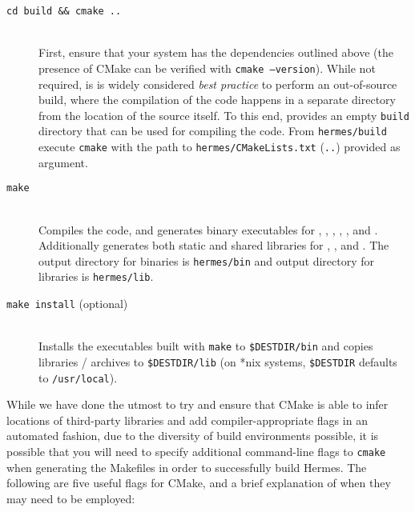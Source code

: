 \documentclass[11pt]{article}
\begin{document}
\begin{description}
  \item[{\tt cd build \&\& cmake ..}] \hfill \\
    First, ensure that your system has the dependencies outlined above (the presence of CMake can be verified with {\tt cmake --version}). While not required, is is widely considered {\em best practice} to perform an out-of-source build, where the compilation of the code happens in a separate directory from the location of the source itself. To this end, \hermes provides an empty {\tt build} directory that can be used for compiling the code. From {\tt hermes/build} execute {\tt cmake} with the path to {\tt hermes/CMakeLists.txt} ({\tt ..}) provided as argument.
  \item[{\tt make}] \hfill \\
    Compiles the code, and generates binary executables for \fft, \rnamfpt, \rnaeq, \fftmfpt, \ffteq, and \rateeq. Additionally generates both static and shared libraries for \fft, \rnamfpt, and \rnaeq. The output directory for binaries is {\tt hermes/bin} and output directory for libraries is {\tt hermes/lib}.
  \item[{\tt make install} \textnormal{(optional)}] \hfill \\
    Installs the executables built with {\tt make} to {\tt \$DESTDIR/bin} and copies libraries / archives to {\tt \$DESTDIR/lib} (on *nix systems, {\tt \$DESTDIR} defaults to {\tt /usr/local}).
\end{description}


While we have done the utmost to try and ensure that CMake is able to infer locations of third-party libraries and add compiler-appropriate flags in an automated fashion, due to the diversity of build environments possible, it is possible that you will need to specify additional command-line flags to {\tt cmake} when generating the Makefiles in order to successfully build Hermes. The following are five useful flags for CMake, and a brief explanation of when they may need to be employed:
\end{document}
